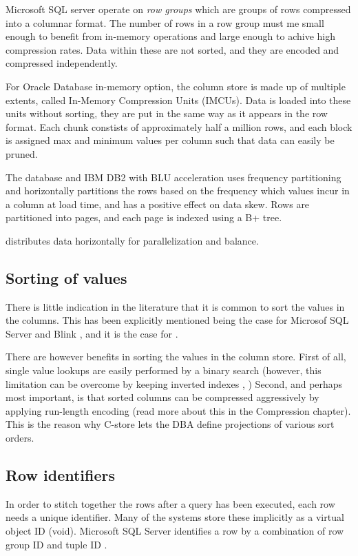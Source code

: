 Microsoft SQL server operate on \textit{row groups} which are groups of rows compressed into a columnar format. The number of rows in a row group must me small enough to benefit from in-memory operations and large enough to achive high compression rates. Data within these are not sorted, and they are encoded and compressed independently.

For Oracle Database in-memory option, the column store is made up of multiple extents, called In-Memory Compression Units (IMCUs). Data is loaded into these units without sorting, they are put in the same way as it appears in the row format. Each chunk constists of approximately half a million rows, and each block is assigned max and minimum values per column such that data can easily be pruned.

The  database and IBM DB2 with BLU acceleration  \cite{Barber2012-xt, Raman2013-em, Raman2008-gi} uses frequency partitioning and horizontally partitions the rows based on the frequency which values incur in a column at load time, and has a positive effect on data skew. Rows are partitioned into pages, and each page is indexed using a B+ tree.

 distributes data horizontally for parallelization and balance.

\subsection{Sorting of values}
\label{sub:Sorting of values}
There is little indication in the literature that it is common to sort the values in the columns. This has been explicitly mentioned being the case for Microsof SQL Server \cite{Larson2013-mc} and Blink \cite{Raman2013-em}, and it is the case for .

There are however benefits in sorting the values in the column store. First of all, single value lookups are easily performed by a binary search (however, this limitation can be overcome by keeping inverted indexes \cite{Lemke2010-is}, \cite{Schwalb2014-hn}) Second, and perhaps most important, is that sorted columns can be compressed aggressively by applying run-length encoding (read more about this in the Compression chapter). This is the reason why C-store \cite{Stonebraker2005-qz} lets the DBA define projections of various sort orders.

\subsection{Row identifiers}
\label{sub:Row identifiers}
In order to stitch together the rows after a query has been executed, each row needs a unique identifier. Many of the systems store these implicitly \cite{Boncz2002-yj, Raman2013-em, Stonebrake2005-qz, Lamb2012-kg} as a virtual object ID (void). Microsoft SQL Server identifies a row by a combination of row group ID and tuple ID \cite{Larson2013-mc}.


